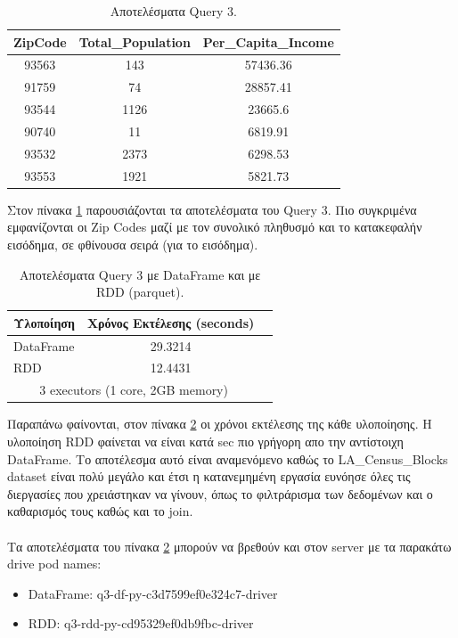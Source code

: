 \documentclass[12pt, a4paper]{article}
\begin{document}
\begin{table}[h!]
\centering
\begin{tabular}{ccc} 
\hline
ZipCode & Total\_Population & Per\_Capita\_Income \\ 
\hline
93563 & 143  & 57436.36 \\
91759 & 74   & 28857.41 \\
93544 & 1126 & 23665.6 \\
90740 & 11   & 6819.91 \\
93532 & 2373 & 6298.53 \\
93553 & 1921 & 5821.73 \\

\hline
\end{tabular}
\caption{Αποτελέσματα Query 3.}
\label{q3_results_all}
\end{table}

Στον πίνακα \ref{q3_results_all} παρουσιάζονται τα αποτελέσματα του Query 3. Πιο
συγκριμένα εμφανίζονται οι Zip Codes μαζί με τον συνολικό πληθυσμό και το
κατακεφαλήν εισόδημα, σε φθίνουσα σειρά (για το εισόδημα).


\begin{table}[h!]
\centering
\begin{tabular}{lcc} 
\hline
Υλοποίηση & Χρόνος Εκτέλεσης (seconds) \\ 
\hline
DataFrame & 29.3214  \\
RDD       & 12.4431 \\

\hline
\multicolumn{2}{c}{3 executors (1 core, 2GB memory)}
\end{tabular}
\caption{Αποτελέσματα Query 3 με DataFrame και με RDD (parquet).}
\label{q3_results_all_parquet}
\end{table}

Παραπάνω φαίνονται, στον πίνακα \ref{q3_results_all_parquet} οι χρόνοι εκτέλεσης
της κάθε υλοποίησης. Η υλοποίηση RDD φαίνεται να είναι κατά  sec πιο
γρήγορη απο την αντίστοιχη DataFrame. Το αποτέλεσμα αυτό είναι αναμενόμενο
καθώς το LA\_Census\_Blocks dataset είναι πολύ μεγάλο και έτσι η κατανεμημένη 
εργασία ευνόησε όλες τις διεργασίες που χρειάστηκαν να γίνουν, όπως το φιλτράρισμα
των δεδομένων και ο καθαρισμός τους καθώς και το join.
\\
\\
\noindent Τα αποτελέσματα του πίνακα \ref{q3_results_all_parquet} μπορούν να βρεθούν και στον server
με τα παρακάτω drive pod names: 

\begin{itemize}
\item DataFrame: q3-df-py-c3d7599ef0e324c7-driver
\item RDD: q3-rdd-py-cd95329ef0db9fbc-driver
\end{itemize}
\end{document}
